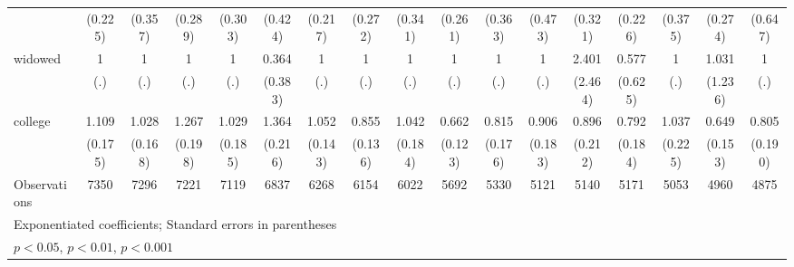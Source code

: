 {\begin{tabular}{l*{16}{c}}
                    &     (0.225)         &     (0.357)         &     (0.289)         &     (0.303)         &     (0.424)         &     (0.217)         &     (0.272)         &     (0.341)         &     (0.261)         &     (0.363)         &     (0.473)         &     (0.321)         &     (0.226)         &     (0.375)         &     (0.274)         &     (0.647)         \\
[1em]
widowed             &           1         &           1         &           1         &           1         &       0.364         &           1         &           1         &           1         &           1         &           1         &           1         &       2.401         &       0.577         &           1         &       1.031         &           1         \\
                    &         (.)         &         (.)         &         (.)         &         (.)         &     (0.383)         &         (.)         &         (.)         &         (.)         &         (.)         &         (.)         &         (.)         &     (2.464)         &     (0.625)         &         (.)         &     (1.236)         &         (.)         \\
[1em]
college             &       1.109         &       1.028         &       1.267         &       1.029         &       1.364         &       1.052         &       0.855         &       1.042         &       0.662\sym{*}  &       0.815         &       0.906         &       0.896         &       0.792         &       1.037         &       0.649         &       0.805         \\
                    &     (0.175)         &     (0.168)         &     (0.198)         &     (0.185)         &     (0.216)         &     (0.143)         &     (0.136)         &     (0.184)         &     (0.123)         &     (0.176)         &     (0.183)         &     (0.212)         &     (0.184)         &     (0.225)         &     (0.153)         &     (0.190)         \\
\hline
Observations        &        7350         &        7296         &        7221         &        7119         &        6837         &        6268         &        6154         &        6022         &        5692         &        5330         &        5121         &        5140         &        5171         &        5053         &        4960         &        4875         \\
\hline\hline
\multicolumn{17}{l}{\footnotesize Exponentiated coefficients; Standard errors in parentheses}\\
\multicolumn{17}{l}{\footnotesize \sym{*} \(p<0.05\), \sym{**} \(p<0.01\), \sym{***} \(p<0.001\)}\\
\end{tabular}
}
